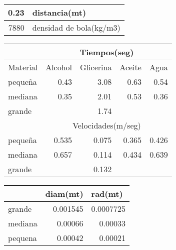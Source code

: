 \documentclass[11pt, letterpaper]{article}
\begin{document}
\begin{center}
    \begin{tabular}{|r|l|}
    \toprule
    0.23  & distancia(mt) \\
    \midrule
    7880  & densidad de bola(kg/m3) \\
    \bottomrule
    \end{tabular}%
  \label{tab:addlabel}%
\end{center}%
\begin{center}
    \begin{tabular}{|l|r|r|r|r|}
\cmidrule{2-5}    \multicolumn{1}{r|}{} & \multicolumn{4}{c|}{Tiempos(seg)} \\
    \midrule
    \multicolumn{1}{|c|}{Material} & \multicolumn{1}{c|}{Alcohol} & \multicolumn{1}{c|}{Glicerina} & \multicolumn{1}{c|}{Aceite} & \multicolumn{1}{c|}{Agua} \\
    \midrule
    pequeña & 0.43  & 3.08  & 0.63  & 0.54 \\
    \midrule
    mediana & 0.35  & 2.01  & 0.53  & 0.36 \\
    \midrule
    grande &       & 1.74  &       &  \\
    \midrule
    \multicolumn{1}{r|}{} & \multicolumn{4}{c|}{Velocidades(m/seg)} \\
    \midrule
    pequeña & 0.535 & 0.075 & 0.365 & 0.426 \\
    \midrule
    mediana & 0.657 & 0.114 & 0.434 & 0.639 \\
    \midrule
    grande &       & 0.132 &       &  \\
    \bottomrule
    \end{tabular}%
  \label{tab:addlabel}%
\end{center}%
\begin{center}
    \begin{tabular}{|l|r|r|}
\cmidrule{2-3}    \multicolumn{1}{r|}{} & \multicolumn{1}{l|}{diam(mt)} & \multicolumn{1}{l|}{rad(mt)} \\
    \midrule
    grande & 0.001545 & 0.0007725 \\
    \midrule
    mediana & 0.00066 & 0.00033 \\
    \midrule
    pequena & 0.00042 & 0.00021 \\
    \bottomrule
    \end{tabular}%
  \label{tab:addlabel}%
\end{center}%
\end{document}
